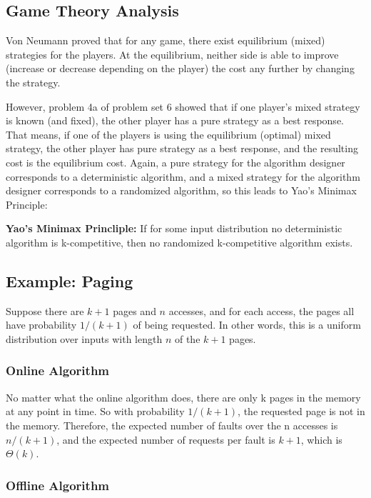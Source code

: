 \documentclass{article}
\begin{document}
\subsection{Game Theory Analysis}

Von Neumann proved that for any game, there exist equilibrium (mixed) strategies for the players.  At the equilibrium, neither side is able to improve (increase or decrease depending on the player) the cost any further by changing the strategy.

However, problem 4a of problem set 6 showed that if one player's mixed strategy is known (and fixed), the other player has a pure strategy as a best response.  That means, if one of the players is using the equilibrium (optimal) mixed strategy, the other player has pure strategy as a best response, and the resulting cost is the equilibrium cost.  Again, a pure strategy for the algorithm designer corresponds to a deterministic algorithm, and a mixed strategy for the algorithm designer corresponds to a randomized algorithm, so this leads to Yao's Minimax Principle:

\begin{theorem}
  \textbf{Yao's Minimax Princliple:} If for some input distribution no deterministic algorithm is k-competitive, then no randomized k-competitive algorithm exists.
\end{theorem}

\subsection{Example: Paging}

Suppose there are $k+1$ pages and $n$ accesses, and for each access, the pages all have probability $1/(k+1)$ of being requested.  In other words, this is a uniform distribution over inputs with length $n$ of the $k+1$ pages.

\subsubsection{Online Algorithm}

No matter what the online algorithm does, there are only k pages in the memory at any point in time.  So with probability $1/(k+1)$, the requested page is not in the memory.  Therefore, the expected number of faults over the n accesses is $n/(k+1)$, and the expected number of requests per fault is $k+1$, which is $\Theta(k)$.

\subsubsection{Offline Algorithm}
\end{document}
